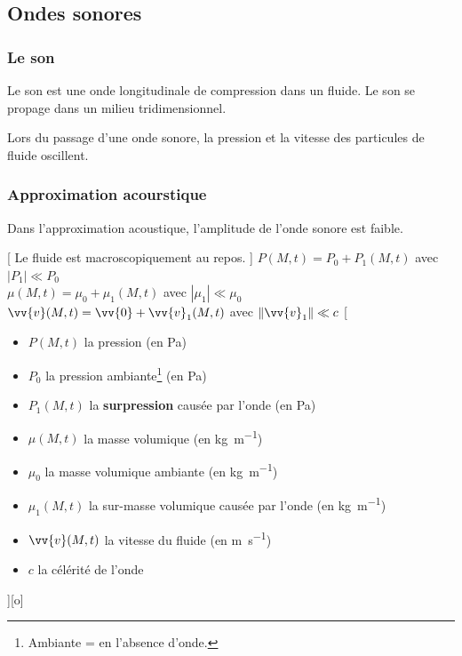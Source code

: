 
\subsection{Ondes sonores}
\subsubsection{Le son}
Le son est une onde longitudinale de compression dans un fluide. Le son se propage dans un milieu tridimensionnel.

Lors du passage d'une onde sonore, la pression et la vitesse des particules de fluide oscillent.


\subsubsection{Approximation acourstique}
Dans l'approximation acoustique, l'amplitude de l'onde sonore est faible.

[
    Le fluide est macroscopiquement au repos.
]
{
    \normalsize
    $P(M,t)=P_0+P_1(M,t)$ avec $|P_1|\ll P_0$\\
    $\mu(M,t)=\mu_0+\mu_1(M,t)$ avec $|\mu_1|\ll \mu_0$\\
    $\vv{v}(M,t)=\vv{0}+\vv{v}_1(M,t)$ avec $\|\vv{v}_1\|\ll c$
}
[
    \begin{itemize}
        \item $P(M,t)$ la pression (en \unit{Pa})
        \item $P_0$ la pression ambiante\footnote{Ambiante = en l'absence d'onde.} (en \unit{Pa})
        \item $P_1(M,t)$ la \textbf{surpression} causée par l'onde (en \unit{Pa})
        \item $\mu(M,t)$ la masse volumique (en \unit{kg.m^{-1}})
        \item $\mu_0$ la masse volumique ambiante (en \unit{kg.m^{-1}})
        \item $\mu_1(M,t)$ la sur-masse volumique causée par l'onde (en \unit{kg.m^{-1}})
        \item $\vv{v}(M,t)$ la vitesse du fluide (en \unit{m.s^{-1}})
        \item $c$ la célérité de l'onde
    \end{itemize}
][o]

